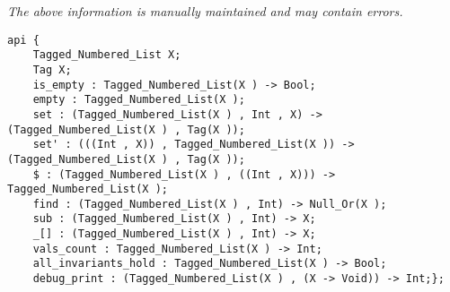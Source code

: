 \label{api:Tagged\_Numbered\_List}

{\tiny \it The above information is manually maintained and may contain errors.}
\begin{verbatim}
api {
    Tagged_Numbered_List X;
    Tag X;
    is_empty : Tagged_Numbered_List(X ) -> Bool;
    empty : Tagged_Numbered_List(X );
    set : (Tagged_Numbered_List(X ) , Int , X) -> (Tagged_Numbered_List(X ) , Tag(X ));
    set' : (((Int , X)) , Tagged_Numbered_List(X )) -> (Tagged_Numbered_List(X ) , Tag(X ));
    $ : (Tagged_Numbered_List(X ) , ((Int , X))) -> Tagged_Numbered_List(X );
    find : (Tagged_Numbered_List(X ) , Int) -> Null_Or(X );
    sub : (Tagged_Numbered_List(X ) , Int) -> X;
    _[] : (Tagged_Numbered_List(X ) , Int) -> X;
    vals_count : Tagged_Numbered_List(X ) -> Int;
    all_invariants_hold : Tagged_Numbered_List(X ) -> Bool;
    debug_print : (Tagged_Numbered_List(X ) , (X -> Void)) -> Int;};
\end{verbatim}
\index[fun]{\_[]}
\index[fun]{\$}
